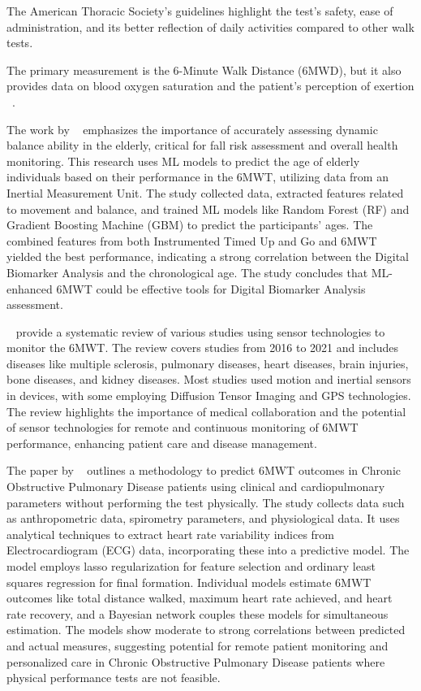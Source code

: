 The American Thoracic Society's guidelines highlight the test's safety, ease of administration, and its better reflection of daily activities compared to other walk tests. 

The primary measurement is the 6-Minute Walk Distance (6MWD), but it also provides data on blood oxygen saturation and the patient's perception of exertion ~\cite{6MWT}.

The work by ~\textcite{6MW-ML} emphasizes the importance of accurately assessing dynamic balance ability in the elderly, critical for fall risk assessment and overall health monitoring. This research uses ML models to predict the age of elderly individuals based on their performance in the 6MWT, utilizing data from an Inertial Measurement Unit. The study collected data, extracted features related to movement and balance, and trained ML models like Random Forest (RF) and Gradient Boosting Machine (GBM) to predict the participants' ages. The combined features from both  Instrumented Timed Up and Go and 6MWT yielded the best performance, indicating a strong correlation between the Digital Biomarker Analysis and the chronological age. The study concludes that ML-enhanced 6MWT could be effective tools for Digital Biomarker Analysis assessment.

~\textcite{6MWtech} provide a systematic review of various studies using sensor technologies to monitor the 6MWT. The review covers studies from 2016 to 2021 and includes diseases like multiple sclerosis, pulmonary diseases, heart diseases, brain injuries, bone diseases, and kidney diseases. Most studies used motion and inertial sensors in devices, with some employing Diffusion Tensor Imaging and GPS technologies. The review highlights the importance of medical collaboration and the potential of sensor technologies for remote and continuous monitoring of 6MWT performance, enhancing patient care and disease management.

The paper by ~\textcite{ROMERO2022107020} outlines a methodology to predict 6MWT outcomes in Chronic Obstructive Pulmonary Disease patients using clinical and cardiopulmonary parameters without performing the test physically. The study collects data such as anthropometric data, spirometry parameters, and physiological data. It uses analytical techniques to extract heart rate variability indices from Electrocardiogram (ECG) data, incorporating these into a predictive model. The model employs lasso regularization for feature selection and ordinary least squares regression for final formation. Individual models estimate 6MWT outcomes like total distance walked, maximum heart rate achieved, and heart rate recovery, and a Bayesian network couples these models for simultaneous estimation. The models show moderate to strong correlations between predicted and actual measures, suggesting potential for remote patient monitoring and personalized care in Chronic Obstructive Pulmonary Disease patients where physical performance tests are not feasible.


